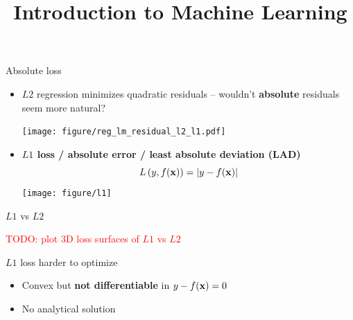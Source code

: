 \documentclass[11pt,compress,t,notes=noshow, xcolor=table]{beamer}
\title{Introduction to Machine Learning}
\institute{\href{https://compstat-lmu.github.io/lecture_i2ml/}{compstat-lmu.github.io/lecture\_i2ml}}
\date{}
\begin{document}


\begin{vbframe}{Absolute loss}

\begin{itemize}
    \item $L2$ regression minimizes quadratic residuals -- wouldn't 
    \textbf{absolute} residuals seem more natural? 
    
    \vspace{0.2cm}
    \texttt{[image: figure/reg\_lm\_residual\_l2\_l1.pdf]}
    \item \textbf{$L1$ loss / absolute error / least absolute deviation (LAD)}
    $$L\left(y, f(\mathbf{x})\right) = |y - f(\mathbf{x})|$$
    \texttt{[image: figure/l1]} 
\end{itemize}

\end{vbframe}


\begin{vbframe}{$L1$ vs $L2$}

\textcolor{red}{TODO: plot 3D loss surfaces of $L1$ vs $L2$}
\vfill

$L1$ loss harder to optimize
\begin{itemize}
    \item Convex but \textbf{not differentiable} in 
    $y - f(\mathbf{x}) = 0$
    \item No analytical solution
\end{itemize}

\end{vbframe}

\end{document}
